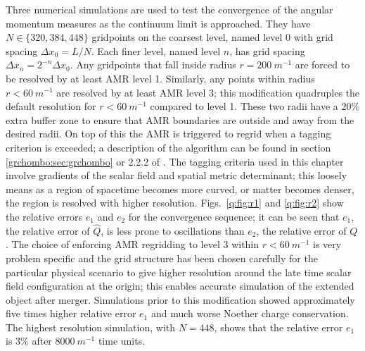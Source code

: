 Three numerical simulations are used to test the convergence of the angular momentum
measures as the continuum limit is approached. They have $N\in\{320,384,448\}$
gridpoints on the coarsest level, named level $0$ with grid spacing $\Delta x_0 = L/N$.
Each finer level, named level $n$, has grid spacing $\Delta x_n = 2^{-n} \Delta x_0$.
Any gridpoints that fall inside radius $r= 200 ~m^{-1}$ are forced to be resolved
by at least AMR level 1. Similarly, any points within radius $r<60 ~m^{-1}$ are
resolved by at least AMR level 3; this modification quadruples the default resolution
for $r<60 ~m^{-1}$ compared to level 1. These two radii have a $20\%$ extra buffer
zone to ensure that AMR boundaries are outside and away from the desired radii.
On top of this the AMR is triggered to regrid when a tagging criterion is exceeded;
a description of the algorithm can be found in section \ref{grchombo:sec:grchombo} or  2.2.2 of \cite{Clough_2015}.
The tagging criteria used in this chapter involve gradients of the scalar field
and spatial metric determinant; this loosely means as a region of spacetime becomes
more curved, or matter becomes denser, the region is resolved with higher resolution.
Figs.~\ref{q:fig:r1} and \ref{q:fig:r2} show the relative errors $e_1$ and $e_2$
for the convergence sequence; it can be seen that $e_1$, the relative error of
$\hat Q$, is less prone to oscillations than $e_2$, the relative error of $Q$.
The choice of enforcing AMR regridding to level 3 within $r<60 ~m^{-1}$ is very
problem specific and the grid structure has been chosen carefully for the particular
physical scenario to give higher resolution around the late time scalar field
configuration at the origin; this enables accurate simulation of the extended
object after merger. Simulations prior to this modification showed approximately
five times higher relative error $e_1$ and much worse Noether charge conservation.
The highest resolution simulation, with $N=448$, shows that the relative error
$e_1$ is $3\%$ after $8000 ~m^{-1}$ time units.




